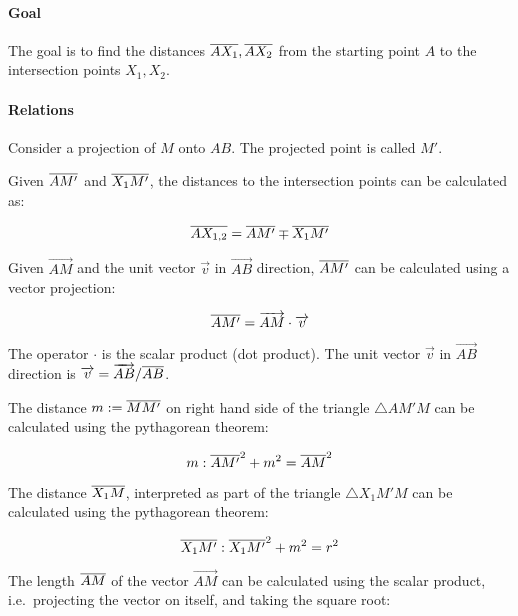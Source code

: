 
\paragraph{Goal}

The goal is to find the distances \(\overline{AX_1}, \overline{AX_2}\) from the
starting point \(A\) to the intersection points \(X_1, X_2\).

\paragraph{Relations}

Consider a projection of \(M\) onto \(AB\). The projected point is
called \(M'\).

Given \(\overline{A M'}\) and \(\overline{X_1 M'}\), the distances to the
intersection points can be calculated as:

\begin{equation} \overline{A X_{1,2}} = \overline{A M'} \mp \overline{X_1 M'} \end{equation}

Given \(\vec{AM}\) and the unit vector \(\vec{v}\) in \(\vec{AB}\)
direction, \(\overline{AM'}\) can be calculated using a vector projection:

\begin{equation} \overline{AM'} = \overrightarrow{AM} \cdot \overrightarrow{v} \end{equation}

The operator \(\cdot\) is the scalar product (dot product). The unit
vector \(\vec{v}\) in \(\vec{AB}\) direction is
\(\overrightarrow{v} = \overrightarrow{AB} / \overline{AB}\).

The distance \(m:=\overline{MM'}\) on right hand side of the triangle
\(\triangle AM'M\) can be calculated using the pythagorean theorem:

\begin{equation} m: \overline{AM'}^2 + m^2 = \overline{AM}^2 \end{equation}

The distance \(\overline{X_1 M}\), interpreted as part of the triangle
\(\triangle X_1 M' M\) can be calculated using the pythagorean theorem:

\begin{equation} \overline{X_1 M'}: \overline{X_1 M'}^2 + m^2 = r^2 \end{equation}

The length \(\overline{AM}\) of the vector \(\vec{AM}\) can be calculated
using the scalar product, i.e.~projecting the vector on itself, and
taking the square root:


